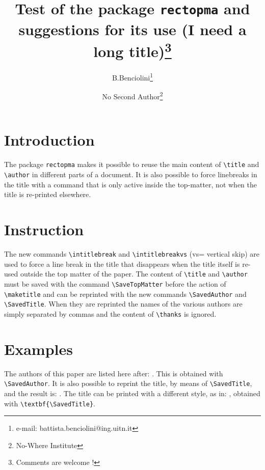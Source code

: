 \documentclass[a4paper,10pt]{article}
\date{ }
\title{Test of the package \texttt{rectopma} \intitlebreak and 
suggestions for its use \intitlebreakvs (I need a long title)\thanks{
Comments are welcome !}}
\author{B.Benciolini\thanks{e-mail: battista.benciolini@ing.uitn.it}
\and  No Second Author\thanks{No-Where Institute}}
\begin{document}
\maketitle 
%
\section{Introduction}
The package \verb+rectopma+ makes it possible to reuse the main 
content of \verb+\title+ and \verb+\author+ in different parts of a 
document. 
It is also possible to force linebreaks in the title with a command 
that is only active inside the top-matter, not when the title is 
re-printed elsewhere.
%
\section{Instruction}
The new commands \verb+\intitlebreak+ and \verb+\intitlebreakvs+
(vs= vertical skip) are used to force a line break in the title 
that disappears when the title itself is re-used outside the top matter 
of the paper.
The content of \verb+\title+ and \verb+\author+ must be saved with the 
command \verb+\SaveTopMatter+ before the action of \verb+\maketitle+ 
and can be reprinted with the new commands \verb+\SavedAuthor+
and \verb+\SavedTitle+. When they are reprinted the names of the 
various authors are simply separated by commas and the content of 
\verb+\thanks+ is ignored.
%
\section{Examples}
The authors of this paper are listed here after: \SavedAuthor. This 
is obtained with \verb+\SavedAuthor+. It is also possible to reprint 
the title, by means of  \verb+\SavedTitle+, and the result is: 
\SavedTitle. The title can be printed with a different style, as in:
\textbf{\SavedTitle}, obtained  with  \verb+\textbf{\SavedTitle}+.
%
\end{document}
